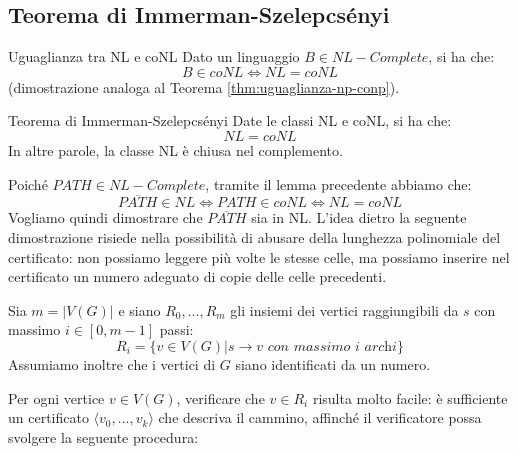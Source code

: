 \subsection{Teorema di Immerman-Szelepcsényi} 
\begin{Lemma}{Uguaglianza tra NL e coNL}{}
Dato un linguaggio $B\in NL-Complete$, si ha che:
\begin{equation*}
    B\in coNL \iff NL = coNL
\end{equation*}
(dimostrazione analoga al Teorema \ref{thm:uguaglianza-np-conp}).
\end{Lemma}

\begin{Thm}{Teorema di Immerman-Szelepcsényi}{}
Date le classi NL e coNL, si ha che:
\begin{equation*}
    NL = coNL    
\end{equation*}
In altre parole, la classe NL è chiusa nel complemento.

\begin{demonstration}
Poiché $PATH\in NL-Complete$, tramite il lemma precedente abbiamo che:
\begin{equation*}
    \overline{PATH}\in NL\iff PATH\in coNL\iff NL = coNL    
\end{equation*}
Vogliamo quindi dimostrare che $\overline{PATH}$ sia in NL. L’idea dietro la seguente dimostrazione risiede nella possibilità di abusare della lunghezza polinomiale del certificato: non possiamo leggere più volte le stesse celle, ma possiamo inserire nel certificato un numero adeguato di copie delle celle precedenti.

Sia $m = |V(G)|$ e siano $R_0,...,R_m$ gli insiemi dei vertici raggiungibili da $s$ con massimo $i\in [0, m-1]$ passi:
\begin{equation*}
    R_i = \{v\in V(G) | s\to v\textit{ con massimo }i\textit{ archi}\}
\end{equation*}
Assumiamo inoltre che i vertici di $G$ siano identificati da un numero.

Per ogni vertice $v\in V (G)$, verificare che $v\in R_i$ risulta molto facile: è sufficiente un certificato $\langle v_0,...,v_k\rangle$ che descriva il cammino, affinché il verificatore possa svolgere la seguente procedura:


\end{demonstration}
\end{Thm}
